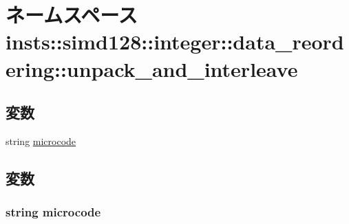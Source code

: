 \hypertarget{namespaceinsts_1_1simd128_1_1integer_1_1data__reordering_1_1unpack__and__interleave}{
\section{ネームスペース insts::simd128::integer::data\_\-reordering::unpack\_\-and\_\-interleave}
\label{namespaceinsts_1_1simd128_1_1integer_1_1data__reordering_1_1unpack__and__interleave}
}
\subsection*{変数}
\begin{DoxyCompactItemize}
\item 
string \hyperlink{namespaceinsts_1_1simd128_1_1integer_1_1data__reordering_1_1unpack__and__interleave_a770f11a173e99389a8802f0107ed8f52}{microcode}
\end{DoxyCompactItemize}


\subsection{変数}
\hypertarget{namespaceinsts_1_1simd128_1_1integer_1_1data__reordering_1_1unpack__and__interleave_a770f11a173e99389a8802f0107ed8f52}{
\subsubsection[{microcode}]{\setlength{\rightskip}{0pt plus 5cm}string {\bf microcode}}}
\label{namespaceinsts_1_1simd128_1_1integer_1_1data__reordering_1_1unpack__and__interleave_a770f11a173e99389a8802f0107ed8f52}
